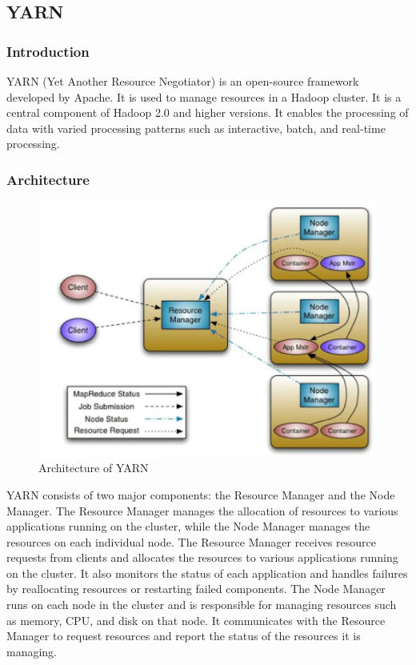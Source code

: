 \documentclass[12pt]{article}
\begin{document}
\subsection{YARN}
\subsubsection{Introduction}
YARN (Yet Another Resource Negotiator) is an open-source framework developed by Apache. It is used to manage resources in a Hadoop cluster. It is a central component of Hadoop 2.0 and higher versions. It enables the processing of data with varied processing patterns such as interactive, batch, and real-time processing.
\subsubsection{Architecture}
\begin{figure}[h!]
    \centering
    \includegraphics[scale = 0.3]{images/YARN.png}
    \caption{Architecture of YARN}
\end{figure}
YARN consists of two major components: the Resource Manager and the Node Manager. The Resource Manager manages the allocation of resources to various applications running on the cluster, while the Node Manager manages the resources on each individual node. The Resource Manager receives resource requests from clients and allocates the resources to various applications running on the cluster. It also monitors the status of each application and handles failures by reallocating resources or restarting failed components. The Node Manager runs on each node in the cluster and is responsible for managing resources such as memory, CPU, and disk on that node. It communicates with the Resource Manager to request resources and report the status of the resources it is managing.
\end{document}
